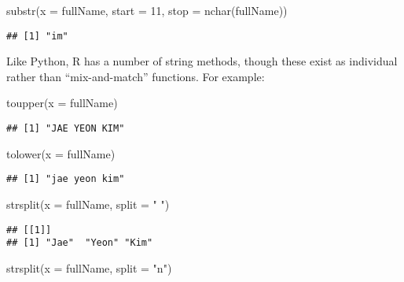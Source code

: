 \documentclass[
]{book}
\newenvironment{Shaded}{\begin{snugshade}}{\end{snugshade}}
\newcommand{\AttributeTok}[1]{\textcolor[rgb]{0.77,0.63,0.00}{#1}}
\newcommand{\DecValTok}[1]{\textcolor[rgb]{0.00,0.00,0.81}{#1}}
\newcommand{\FunctionTok}[1]{\textcolor[rgb]{0.00,0.00,0.00}{#1}}
\newcommand{\NormalTok}[1]{#1}
\newcommand{\StringTok}[1]{\textcolor[rgb]{0.31,0.60,0.02}{#1}}
\begin{document}
\begin{Shaded}
\begin{Highlighting}[]
\FunctionTok{substr}\NormalTok{(}\AttributeTok{x =}\NormalTok{ fullName, }\AttributeTok{start =} \DecValTok{11}\NormalTok{, }\AttributeTok{stop =} \FunctionTok{nchar}\NormalTok{(fullName))}
\end{Highlighting}
\end{Shaded}

\begin{verbatim}
## [1] "im"
\end{verbatim}

Like Python, R has a number of string methods, though these exist as individual rather than ``mix-and-match'' functions. For example:

\begin{Shaded}
\begin{Highlighting}[]
\FunctionTok{toupper}\NormalTok{(}\AttributeTok{x =}\NormalTok{ fullName)}
\end{Highlighting}
\end{Shaded}

\begin{verbatim}
## [1] "JAE YEON KIM"
\end{verbatim}

\begin{Shaded}
\begin{Highlighting}[]
\FunctionTok{tolower}\NormalTok{(}\AttributeTok{x =}\NormalTok{ fullName)}
\end{Highlighting}
\end{Shaded}

\begin{verbatim}
## [1] "jae yeon kim"
\end{verbatim}

\begin{Shaded}
\begin{Highlighting}[]
\FunctionTok{strsplit}\NormalTok{(}\AttributeTok{x =}\NormalTok{ fullName, }\AttributeTok{split =} \StringTok{" "}\NormalTok{)}
\end{Highlighting}
\end{Shaded}

\begin{verbatim}
## [[1]]
## [1] "Jae"  "Yeon" "Kim"
\end{verbatim}

\begin{Shaded}
\begin{Highlighting}[]
\FunctionTok{strsplit}\NormalTok{(}\AttributeTok{x =}\NormalTok{ fullName, }\AttributeTok{split =} \StringTok{"n"}\NormalTok{)}
\end{Highlighting}
\end{Shaded}
\end{document}
